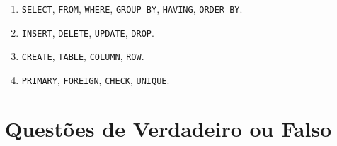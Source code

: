\documentclass[12pt,a4paper]{article}
\begin{document}
\begin{enumerate}[label=\textbf{Q\arabic*.}]
\begin{enumerate}[label=\alph*)]
    \item \texttt{SELECT}, \texttt{FROM}, \texttt{WHERE}, \texttt{GROUP BY}, \texttt{HAVING}, \texttt{ORDER BY}.
    \item \texttt{INSERT}, \texttt{DELETE}, \texttt{UPDATE}, \texttt{DROP}.
    \item \texttt{CREATE}, \texttt{TABLE}, \texttt{COLUMN}, \texttt{ROW}.
    \item \texttt{PRIMARY}, \texttt{FOREIGN}, \texttt{CHECK}, \texttt{UNIQUE}.
\end{enumerate}

\end{enumerate}

\section{Questões de Verdadeiro ou Falso}
\end{document}
